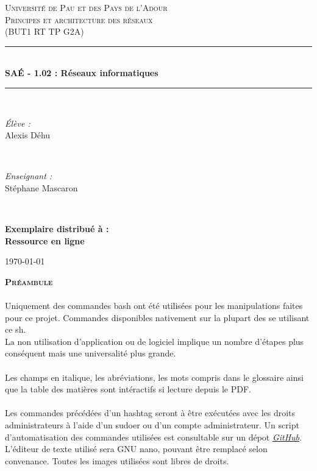 \documentclass[a4paper]{article}
\newcommand{\HRule}{\rule{\linewidth}{0.5mm}}
\begin{document}
\begin{titlepage}
\center
\textsc{\LARGE Université de Pau et des Pays de l’Adour}\\[1.3cm]
\textsc{\Large Principes et architecture des réseaux }\\[0.6cm]
\textsc{\large (BUT1 RT TP G2A)}\\[0.8cm]
\HRule \\[0.4cm]
{ \huge \bfseries SAÉ - 1.02 : Réseaux informatiques}\\[0.4cm]
\HRule \\[1.5cm]
\begin{minipage}{0.4\textwidth}
\begin{flushleft} \large
\emph{Élève :}\\[.15cm]
Alexis Déhu 
\\%
\end{flushleft}
\end{minipage}
~
\begin{minipage}{0.4\textwidth}
\begin{flushright} \large
\emph{Enseignant :}\\[.15cm]
Stéphane Mascaron \end{flushright}
\end{minipage}\\[5cm]
\begin{center}
\large \bfseries Exemplaire distribué à :\\Ressource en ligne
\end{center} 
\vfill \mbox{}
{\large \today}
\end{titlepage}
\vspace{1pt}
\textsc{\textbf{Préambule}}\\\\
Uniquement des commandes bash ont été utilisées pour les manipulations faites pour ce projet. Commandes disponibles nativement sur la plupart des \acrshort{se} utilisant ce \gls{sh}.\\La non utilisation d'application ou de logiciel implique un nombre d'étapes plus conséquent mais une universalité plus grande.\\\\Les champs en italique, les abréviations, les mots compris dans le glossaire ainsi que la table des matières sont intéractifs si lecture depuis le PDF.\\\\Les commandes précédées d'un hashtag seront à être exécutées avec les droits administrateurs à l'aide d'un sudoer ou d'un compte administrateur. Un script d'automatisation des commandes utilisées est consultable sur un dépot \href{}{\textit{GitHub}}. L'éditeur de texte utilisé sera GNU nano, pouvant être remplacé selon convenance. Toutes les images utilisées sont libres de droits.
\newline
\renewcommand*\contentsname{Table des matières}
\tableofcontents
\printglossary[type=\acronymtype, title={Liste des abréviations}]
\printglossary[title={Glossaire}]
\newpage
\end{document}
